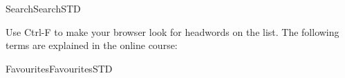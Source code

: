 
\begin{MXContent}{Search}{Search}{STD}
\MGlobalSearchTag

Use Ctrl-F to make your browser look for headwords on the list. The following terms are explained in the online course:


\end{MXContent}

\begin{MXContent}{Favourites}{Favourites}{STD}
\MGlobalFavoTag
{}


\end{MXContent}

\fi
